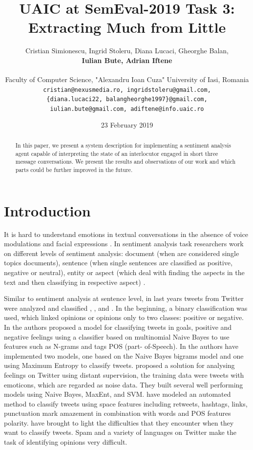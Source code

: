 \documentclass[11pt,a4paper]{article}
\title{UAIC at SemEval-2019 Task 3: Extracting Much from Little}
\author{Cristian Simionescu, Ingrid Stoleru, Diana Lucaci, Gheorghe Balan, \\ \textbf{Iulian Bute, Adrian Iftene}\\\\
  Faculty of Computer Science, "Alexandru Ioan Cuza" University of Iasi, Romania\\
  {\tt cristian@nexusmedia.ro, ingridstoleru@gmail.com, \\
  {\tt \{diana.lucaci22, balangheorghe1997\}@gmail.com,\\
  {\tt iulian.bute@gmail.com, adiftene@info.uaic.ro}}}}
\date{23 February 2019}
\begin{document}
\maketitle

\begin{abstract}
In this paper, we present a system description for implementing a sentiment analysis agent capable of interpreting the state of an interlocutor engaged in short three message conversations. We present the results and observations of our work and which parts could be further improved in the future. 
\end{abstract}

\section{Introduction}

It is hard to understand emotions in textual conversations in the absence of voice modulations and facial expressions \cite{Gupta2017ASA}. In sentiment analysis task researchers work on different levels of sentiment analysis: document (when are considered single topics documents), sentence (when single sentences are classified as positive, negative or neutral), entity or aspect (which deal with finding the aspects in the text and then classifying in respective aspect) \cite{Liu12}. 

Similar to sentiment analysis at sentence level, in last years tweets from Twitter were analyzed and classified \cite{Zhang2017}, \cite{kumar12}, \cite{Mukherjee2013} and \cite{kumar14}. In the beginning, a binary classification was used, which linked opinions or opinions only to two classes: positive or negative. In \cite{Pak2010TwitterAA} the authors proposed a model for classifying tweets in goals, positive and negative feelings using a classifier based on multinomial Naive Bayes to use features such as N-grams and tags POS (part- of-Speech). In \cite{Parikh} the authors have implemented two models, one based on the Naive Bayes bigrams model and one using Maximum Entropy to classify tweets. \cite{Go_Bhayani_Huang_2009} proposed a solution for analysing feelings on Twitter using distant supervision, the training data were tweets with emoticons, which are regarded as noise data. They built several well performing models using Naive Bayes, MaxEnt, and SVM. \cite{barbosa2010} have modeled an automated method to classify tweets using space features including retweets, hashtags, links, punctuation mark amazement in combination with words and POS features polarity. \cite{Luo2013} have brought to light the difficulties that they encounter when they want to classify tweets. Spam and a variety of languages on Twitter make the task of identifying opinions very difficult.
\end{document}
